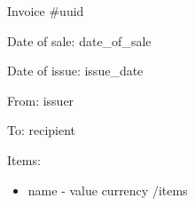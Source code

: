 \documentclass{article}
\begin{document}
  Invoice \#{{uuid}}

  Date of sale: {{date_of_sale}}

  Date of issue: {{issue_date}}

  From:
  {{issuer}}

  To:
  {{recipient}}

  Items:
  \begin{itemize}
    {{#items}}
    \item{ {{name}} - {{value}} {{currency}} }
    {{/items}}
  \end{itemize}
\end{document}
